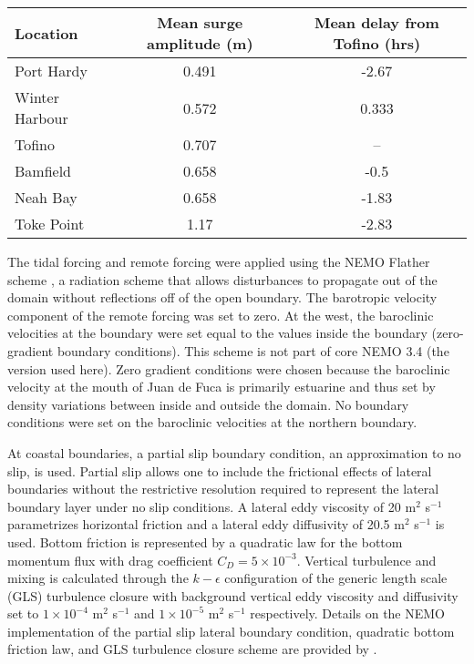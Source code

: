 \documentclass[letterpaper]{tATO2e}
\begin{document}
\begin{table}[h]
\centering 
{} 
{\begin{tabular}{|l |c | c|}
\hline 
Location & Mean surge amplitude (m) & Mean delay from Tofino (hrs) \\
\hline
Port Hardy & 0.491 & -2.67\\
Winter Harbour & 0.572 & 0.333 \\
Tofino  & 0.707 & -- \\
Bamfield & 0.658 & -0.5 \\
Neah Bay & 0.658 & -1.83 \\
Toke Point & 1.17 & -2.83 \\
\hline
\end{tabular}}
\label{tab:pacificsurge}
\end{table}


The tidal forcing and remote forcing were applied using the NEMO Flather scheme \citep{flather1994storm, madec2012nemo}, a radiation scheme that allows disturbances to propagate out of the domain without reflections off of the open boundary. The barotropic velocity component of the remote forcing was set to zero. At the west, the baroclinic velocities at the boundary were set equal to the values inside the boundary (zero-gradient boundary conditions).  This scheme is not part of core NEMO 3.4 (the version used here).  Zero gradient conditions were chosen because the baroclinic velocity at the mouth of Juan de Fuca is primarily estuarine and thus set by density variations between inside and outside the domain. {\color{red} No boundary conditions were set on the baroclinic velocities at the northern boundary.} 

At coastal boundaries, a partial slip boundary condition, an approximation to no slip, is used. Partial slip allows one to include the frictional effects of lateral boundaries without the restrictive resolution required to represent the lateral boundary layer under no slip conditions. A lateral eddy viscosity of 20 m$^2$ s$^{-1}$ parametrizes horizontal friction and a lateral eddy diffusivity of 20.5 m$^2$ s$^{-1}$ is used.  Bottom friction is represented by a quadratic law for the bottom momentum flux with drag coefficient $C_D = 5\times 10^{-3}$. Vertical turbulence and mixing is calculated through the $k-\epsilon$ configuration of the generic length scale (GLS) turbulence closure \citep{umlauf2003generic} with background vertical eddy viscosity and diffusivity set to $1\times10^{-4}$ m$^2$ s$^{-1}$ and $1\times10^{-5}$ m$^2$ s$^{-1}$ respectively. Details on the NEMO implementation of the partial slip lateral boundary condition, quadratic bottom friction law, and GLS turbulence closure scheme are provided by \citet{madec2012nemo}.
\end{document}
